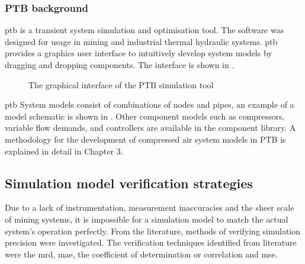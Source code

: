  \subsubsection{PTB background}
 \gls*{ptb} is a transient system simulation and optimisation tool. The software was designed for usage in mining and industrial thermal hydraulic systems. \gls{ptb} provides a graphics user interface to intuitively develop system models by dragging and dropping components. The interface is shown in .
 \par 
\begin{figure}[h!]
 	\centering
 	\caption{The graphical interface of the PTB simulation tool}
 	\label{fig: PTB UI}
 \end{figure}
\gls{ptb} System models consist of combinations of nodes and pipes, an example of a model schematic is shown in . Other component models such as compressors, variable flow demands, and controllers are available in the component library. A methodology for the development of compressed air system models in PTB is explained in detail in Chapter 3.
 	\subsection{Simulation model verification strategies}\label{VerificationLit}
 	Due to a lack of instrumentation, measurement inaccuracies and the sheer scale of mining systems, it is impossible for a simulation model to match the actual system's operation perfectly. From the literature, methods of verifying simulation precision were investigated. The verification techniques identified from literature were the \gls{mrd}, \gls{mae},  the coefficient of determination or correlation and \gls{mse}.%
